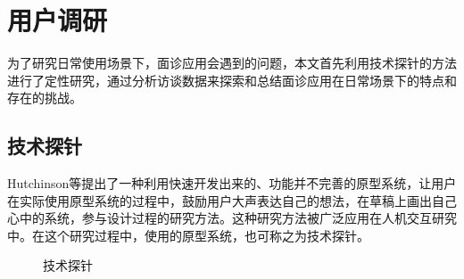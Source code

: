 \chapter{用户调研}

为了研究日常使用场景下，面诊应用会遇到的问题，本文首先利用技术探针\cite{Hutchinson2003Technology}的方法进行了定性研究，通过分析访谈数据来探索和总结面诊应用在日常场景下的特点和存在的挑战。


\section{技术探针}

Hutchinson等\cite{Hutchinson2003Technology}提出了一种利用快速开发出来的、功能并不完善的原型系统，让用户在实际使用原型系统的过程中，鼓励用户大声表达自己的想法，在草稿上画出自己心中的系统，参与设计过程的研究方法。这种研究方法被广泛应用在人机交互研究中。在这个研究过程中，使用的原型系统，也可称之为技术探针。

\begin{figure}[h]
    \centering
    \centering
    \caption{技术探针}
    \label{fig:main}
\end{figure}

